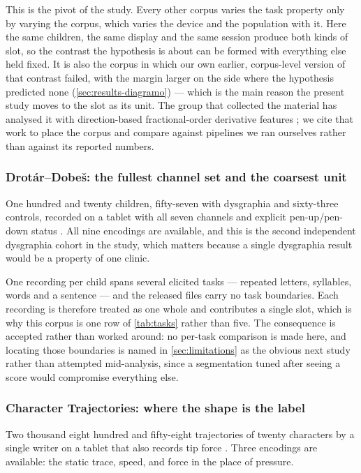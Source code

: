 This is the pivot of the study. Every other corpus varies the task property only by varying the
corpus, which varies the device and the population with it. Here the same children, the same
display and the same session produce both kinds of slot, so the contrast the hypothesis is about
can be formed with everything else held fixed. It is also the corpus in which our own earlier,
corpus-level version of that contrast failed, with the margin larger on the side where the
hypothesis predicted none (\cref{sec:results-diagramo}) --- which is the main reason the present study moves
to the slot as its unit. The group that collected the material has analysed it with
direction-based fractional-order derivative features \citep{gavenciak2025fractional}; we cite that
work to place the corpus and compare against pipelines we ran ourselves rather than against its
reported numbers.

\subsubsection{Drot\'ar--Dobe\v{s}: the fullest channel set and the coarsest unit}
\label{sec:drotar}

One hundred and twenty children, fifty-seven with dysgraphia and sixty-three controls, recorded on
a tablet with all seven channels and explicit pen-up/pen-down status
\citep{drotar2020dysgraphia}. All nine encodings are available, and this is the second independent
dysgraphia cohort in the study, which matters because a single dysgraphia result would be a
property of one clinic.

One recording per child spans several elicited tasks --- repeated letters, syllables, words and a
sentence --- and the released files carry no task boundaries. Each recording is therefore treated
as one whole and contributes a single slot, which is why this corpus is one row of \cref{tab:tasks}
rather than five. The consequence is accepted rather than worked around: no per-task comparison is
made here, and locating those boundaries is named in \cref{sec:limitations} as the obvious next
study rather than attempted mid-analysis, since a segmentation tuned after seeing a score would
compromise everything else.

\subsubsection{Character Trajectories: where the shape is the label}
\label{sec:chartraj}

Two thousand eight hundred and fifty-eight trajectories of twenty characters by a single writer on
a tablet that also records tip force \citep{williams2006chartraj}. Three encodings are available:
the static trace, speed, and force in the place of pressure.

